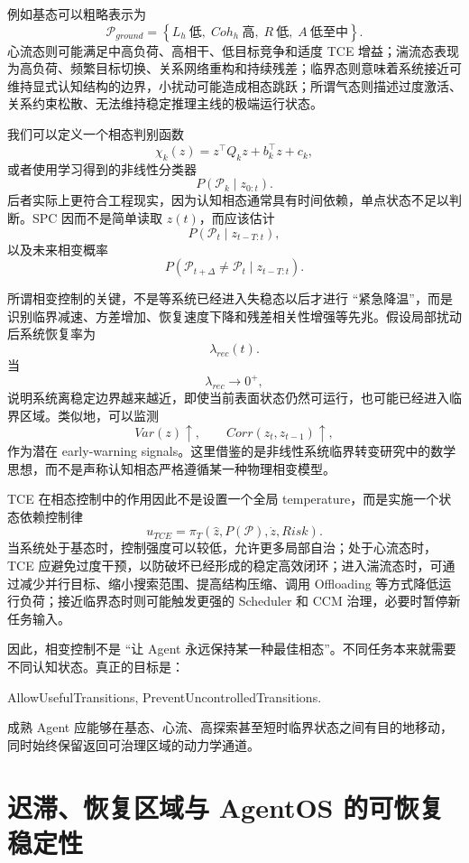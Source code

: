 例如基态可以粗略表示为
\[
\mathcal P_{ground}
=
\left\{
L_h\ \text{低},
\;
Coh_h\ \text{高},
\;
R\ \text{低},
\;
A\ \text{低至中}
\right\}.
\]
心流态则可能满足中高负荷、高相干、低目标竞争和适度 TCE 增益；湍流态表现为高负荷、频繁目标切换、关系网络重构和持续残差；临界态则意味着系统接近可维持显式认知结构的边界，小扰动可能造成相态跳跃；所谓气态则描述过度激活、关系约束松散、无法维持稳定推理主线的极端运行状态。

我们可以定义一个相态判别函数
\[
\chi_k(z)
=
z^\top Q_k z+b_k^\top z+c_k,
\]
或者使用学习得到的非线性分类器
\[
P(\mathcal P_k\mid z_{0:t}).
\]
后者实际上更符合工程现实，因为认知相态通常具有时间依赖，单点状态不足以判断。SPC 因而不是简单读取 $z(t)$，而应该估计
\[
P
\left(
\mathcal P_t
\mid
z_{t-T:t}
\right),
\]
以及未来相变概率
\[
P
\left(
\mathcal P_{t+\Delta}
\neq
\mathcal P_t
\mid
z_{t-T:t}
\right).
\]

所谓相变控制的关键，不是等系统已经进入失稳态以后才进行 ``紧急降温''，而是识别临界减速、方差增加、恢复速度下降和残差相关性增强等先兆。假设局部扰动后系统恢复率为
\[
\lambda_{rec}(t).
\]
当
\[
\lambda_{rec}\rightarrow0^{+},
\]
说明系统离稳定边界越来越近，即使当前表面状态仍然可运行，也可能已经进入临界区域。类似地，可以监测
\[
Var(z)\uparrow,
\qquad
Corr(z_t,z_{t-1})\uparrow,
\]
作为潜在 early-warning signals。这里借鉴的是非线性系统临界转变研究中的数学思想，而不是声称认知相态严格遵循某一种物理相变模型。

TCE 在相态控制中的作用因此不是设置一个全局 temperature，而是实施一个状态依赖控制律
\[
u_{TCE}
=
\pi_T
\left(
\hat z,
P(\mathcal P),
\dot z,
Risk
\right).
\]
当系统处于基态时，控制强度可以较低，允许更多局部自治；处于心流态时，TCE 应避免过度干预，以防破坏已经形成的稳定高效闭环；进入湍流态时，可通过减少并行目标、缩小搜索范围、提高结构压缩、调用 Offloading 等方式降低运行负荷；接近临界态时则可能触发更强的 Scheduler 和 CCM 治理，必要时暂停新任务输入。

因此，相变控制不是 ``让 Agent 永远保持某一种最佳相态''。不同任务本来就需要不同认知状态。真正的目标是：
\begin{statementbox}
AllowUsefulTransitions,
PreventUncontrolledTransitions.
\end{statementbox}
成熟 Agent 应能够在基态、心流、高探索甚至短时临界状态之间有目的地移动，同时始终保留返回可治理区域的动力学通道。

\section{迟滞、恢复区域与 AgentOS 的可恢复稳定性}

